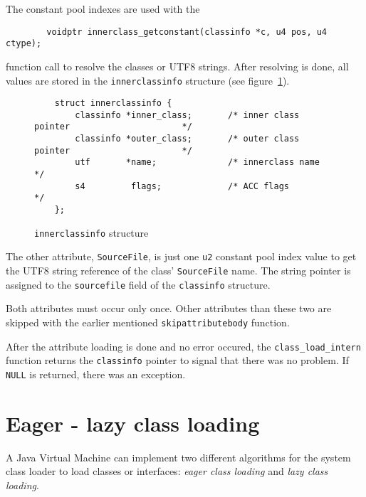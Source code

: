 The constant pool indexes are used with the

\begin{verbatim}
        voidptr innerclass_getconstant(classinfo *c, u4 pos, u4 ctype);
\end{verbatim}

function call to resolve the classes or UTF8 strings. After resolving
is done, all values are stored in the \texttt{innerclassinfo}
structure (see figure~\ref{innerclassinfostructure}).

\begin{figure}[h]
\begin{verbatim}
    struct innerclassinfo {
        classinfo *inner_class;       /* inner class pointer                      */
        classinfo *outer_class;       /* outer class pointer                      */
        utf       *name;              /* innerclass name                          */
        s4         flags;             /* ACC flags                                */
    };
\end{verbatim}
\caption{\texttt{innerclassinfo} structure}
\label{innerclassinfostructure}
\end{figure}

The other attribute, \texttt{SourceFile}, is just one \texttt{u2}
constant pool index value to get the UTF8 string reference of the
class' \texttt{SourceFile} name. The string pointer is assigned to the
\texttt{sourcefile} field of the \texttt{classinfo} structure.

Both attributes must occur only once. Other attributes than these two
are skipped with the earlier mentioned \texttt{skipattributebody}
function.

After the attribute loading is done and no error occured, the
\texttt{class\_load\_intern} function returns the \texttt{classinfo}
pointer to signal that there was no problem. If \texttt{NULL} is
returned, there was an exception.




\section{Eager - lazy class loading}

A Java Virtual Machine can implement two different algorithms for the
system class loader to load classes or interfaces: \textit{eager class
loading} and \textit{lazy class loading}.


